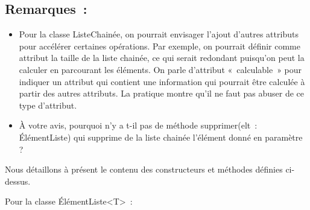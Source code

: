 	\subsection{Remarques~:}
			
		\begin{itemize}
			\item 
				Pour la classe ListeChainée, on pourrait envisager l'ajout d'autres 
				attributs pour accélérer certaines opérations. Par
				exemple, on pourrait définir comme attribut la taille de la liste 
				chainée, ce qui serait redondant puisqu'on peut la
				calculer en parcourant les éléments. On parle d'attribut 
				«~calculable~» pour indiquer un attribut qui contient une
				information qui pourrait être calculée à partir des autres attributs. 
				La pratique montre qu'il ne faut pas abuser de ce type d'attribut.
			\item 
				À votre avis, pourquoi n'y a t-il pas de méthode 
				\textsf{supprimer(elt~: ÉlémentListe)} qui supprime
				de la liste chainée l'élément donné en paramètre ? 
		\end{itemize}
	
		Nous détaillons à présent le contenu des constructeurs 
		et méthodes définies ci-dessus. 
		
		Pour la classe ÉlémentListe<T>~:
		
		
		
		
		
		
